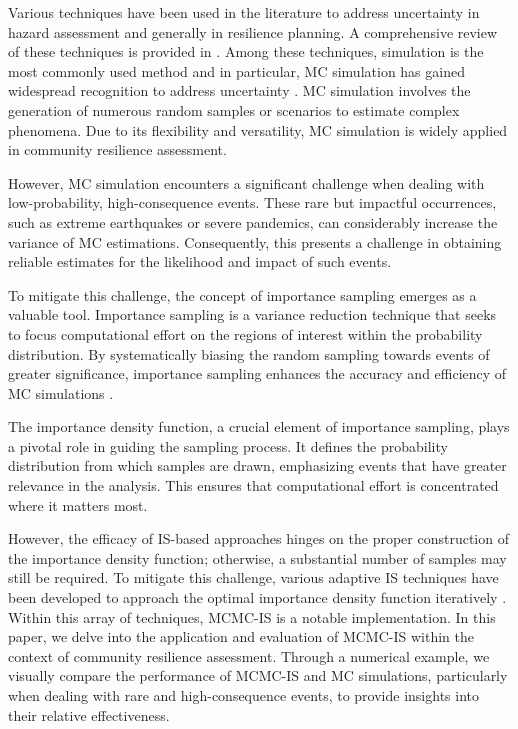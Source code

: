     Various techniques have been used in the literature to address uncertainty in hazard assessment and generally in resilience planning. A comprehensive review of these techniques is provided in \cite{sun_resilience_2020}. Among these techniques, simulation is the most commonly used method \cite{sun_resilience_2020} and in particular, MC simulation has gained widespread recognition to address uncertainty \cite{zheng_bayesian-based_2022, cicilio_electrical_2020, tabandeh_uncertainty_2022, younesi_assessing_2020}. MC simulation involves the generation of numerous random samples or scenarios to estimate complex phenomena. Due to its flexibility and versatility, MC simulation is widely applied in community resilience assessment.

    However, MC simulation encounters a significant challenge when dealing with low-probability, high-consequence events. These rare but impactful occurrences, such as extreme earthquakes or severe pandemics, can considerably increase the variance of MC estimations. Consequently, this presents a challenge in obtaining reliable estimates for the likelihood and impact of such events.
    
    To mitigate this challenge, the concept of importance sampling emerges as a valuable tool. Importance sampling is a variance reduction technique that seeks to focus computational effort on the regions of interest within the probability distribution. By systematically biasing the random sampling towards events of greater significance, importance sampling enhances the accuracy and efficiency of MC simulations \cite{melchers_importance_1989, heinkenschloss_conditional-value-at-risk_2018}.
    
    The importance density function, a crucial element of importance sampling, plays a pivotal role in guiding the sampling process. It defines the probability distribution from which samples are drawn, emphasizing events that have greater relevance in the analysis. This ensures that computational effort is concentrated where it matters most.
    
    However, the efficacy of IS-based approaches hinges on the proper construction of the importance density function; otherwise, a substantial number of samples may still be required. To mitigate this challenge, various adaptive IS techniques have been developed to approach the optimal importance density function iteratively \cite{tomasson_improved_2017, depina_coupling_2017, ching_efficient_2009, chaudhuri_information_2020, aslam_ansari_data-driven_2020}. Within this array of techniques, MCMC-IS is a notable implementation. In this paper, we delve into the application and evaluation of MCMC-IS within the context of community resilience assessment. Through a numerical example, we visually compare the performance of MCMC-IS and MC simulations, particularly when dealing with rare and high-consequence events, to provide insights into their relative effectiveness. 